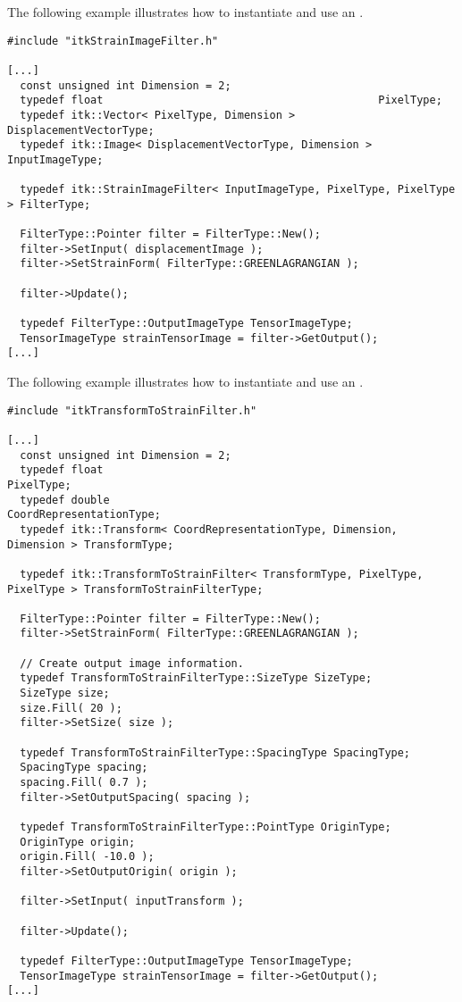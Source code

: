 \documentclass{InsightArticle}
\begin{document}
The following example illustrates how to instantiate and use an .

\begin{verbatim}
#include "itkStrainImageFilter.h"

[...]
  const unsigned int Dimension = 2;
  typedef float                                           PixelType;
  typedef itk::Vector< PixelType, Dimension >             DisplacementVectorType;
  typedef itk::Image< DisplacementVectorType, Dimension > InputImageType;

  typedef itk::StrainImageFilter< InputImageType, PixelType, PixelType > FilterType;

  FilterType::Pointer filter = FilterType::New();
  filter->SetInput( displacementImage );
  filter->SetStrainForm( FilterType::GREENLAGRANGIAN );

  filter->Update();

  typedef FilterType::OutputImageType TensorImageType;
  TensorImageType strainTensorImage = filter->GetOutput();
[...]
\end{verbatim}

The following example illustrates how to instantiate and use an
.

\begin{verbatim}
#include "itkTransformToStrainFilter.h"

[...]
  const unsigned int Dimension = 2;
  typedef float                                                           PixelType;
  typedef double                                                          CoordRepresentationType;
  typedef itk::Transform< CoordRepresentationType, Dimension, Dimension > TransformType;

  typedef itk::TransformToStrainFilter< TransformType, PixelType, PixelType > TransformToStrainFilterType;

  FilterType::Pointer filter = FilterType::New();
  filter->SetStrainForm( FilterType::GREENLAGRANGIAN );

  // Create output image information.
  typedef TransformToStrainFilterType::SizeType SizeType;
  SizeType size;
  size.Fill( 20 );
  filter->SetSize( size );

  typedef TransformToStrainFilterType::SpacingType SpacingType;
  SpacingType spacing;
  spacing.Fill( 0.7 );
  filter->SetOutputSpacing( spacing );

  typedef TransformToStrainFilterType::PointType OriginType;
  OriginType origin;
  origin.Fill( -10.0 );
  filter->SetOutputOrigin( origin );

  filter->SetInput( inputTransform );

  filter->Update();

  typedef FilterType::OutputImageType TensorImageType;
  TensorImageType strainTensorImage = filter->GetOutput();
[...]
\end{verbatim}
\end{document}
